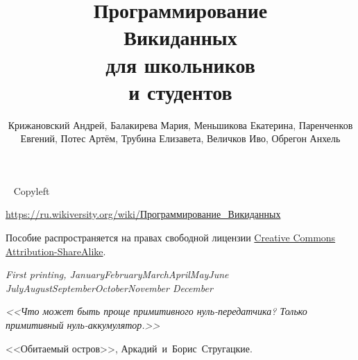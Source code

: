\documentclass[nofonts,justified,nobib]{tufte-book}%
\title{Программирование\\Викиданных\\для школьников\\и студентов}
\author[Крижановский и др.]{Крижановский Андрей, Балакирева Мария, Меньшикова Екатерина, Паренченков Евгений, Потес Артём, Трубина Елизавета, Величков Иво, Обрегон Анхель}
\theoremstyle{definition}
\newcommand{\monthyear}{%
  \ifcase\month\or January\or February\or March\or April\or May\or June\or
  July\or August\or September\or October\or November\or
  December\fi\space\number\year
}
\newcommand{\openepigraph}[2]{%
  \begin{fullwidth}
  \sffamily\large
  \begin{doublespace}
  \noindent\allcaps{#1}\\%
  \noindent\allcaps{#2}%
  \end{doublespace}
  \end{fullwidth}
}
\newcommand{\blankpage}{\newpage\hbox{}\thispagestyle{empty}\newpage}
\begin{document}




\maketitle


\newpage
\begin{fullwidth}
~\vfill
\thispagestyle{empty}
\setlength{\parindent}{0pt}
\setlength{\parskip}{\baselineskip}
Copyleft \textcopyleft\ \the\year\ \thanklessauthor

\par{}

\par\href{https://w.wiki/62E}{https://ru.wikiversity.org/wiki/Программирование\_Викиданных}

\par Пособие распространяется на правах свободной лицензии 
    \href{https://creativecommons.org/licenses/by-sa/4.0/deed.ru}{Creative Commons Attribution-ShareAlike}.


\par\textit{First printing, \monthyear}
\end{fullwidth}

\tableofcontents

\listoffigures

\listoftables

\clearpage
\vfill
\begin{fullwidth}
\begin{doublespace}
\noindent\fontsize{18}{22}\selectfont\itshape
\nohyphenation
<<Что может быть проще примитивного нуль-передатчика? Только примитивный нуль-аккумулятор.>>

<<Обитаемый остров>>, \mbox{Аркадий и Борис Стругацкие}.
\end{doublespace}
\end{fullwidth}
\end{document}

